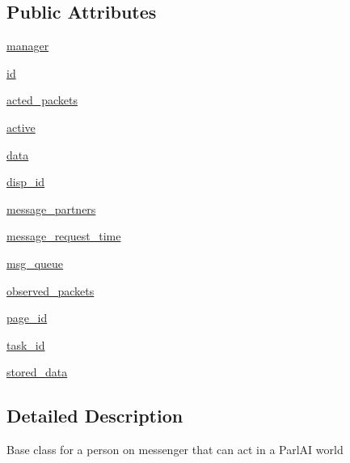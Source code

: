 \subsection*{Public Attributes}
\begin{DoxyCompactItemize}
\item 
\hyperlink{classparlai_1_1messenger_1_1core_1_1agents_1_1MessengerAgent_a9fd8bad20f0717092f529c8f9ed7df94}{manager}
\item 
\hyperlink{classparlai_1_1messenger_1_1core_1_1agents_1_1MessengerAgent_a72910180b745a5021b8d0a9e0957adcd}{id}
\item 
\hyperlink{classparlai_1_1messenger_1_1core_1_1agents_1_1MessengerAgent_a8ff8c167fe3e4793917c3d6e642fa3b5}{acted\+\_\+packets}
\item 
\hyperlink{classparlai_1_1messenger_1_1core_1_1agents_1_1MessengerAgent_afab06698dbe80ea6d9e9b34edbff254f}{active}
\item 
\hyperlink{classparlai_1_1messenger_1_1core_1_1agents_1_1MessengerAgent_a506c2b7c57f4573cc7fc88663fc80c93}{data}
\item 
\hyperlink{classparlai_1_1messenger_1_1core_1_1agents_1_1MessengerAgent_a34f9d8aa8209171eceac226c8aead2f7}{disp\+\_\+id}
\item 
\hyperlink{classparlai_1_1messenger_1_1core_1_1agents_1_1MessengerAgent_a4299892248e815aa4b81252b80ed68ea}{message\+\_\+partners}
\item 
\hyperlink{classparlai_1_1messenger_1_1core_1_1agents_1_1MessengerAgent_a60074f287b87c22153a18c0dc86389f1}{message\+\_\+request\+\_\+time}
\item 
\hyperlink{classparlai_1_1messenger_1_1core_1_1agents_1_1MessengerAgent_a3b73f02aa706918d26fd5cf42a441753}{msg\+\_\+queue}
\item 
\hyperlink{classparlai_1_1messenger_1_1core_1_1agents_1_1MessengerAgent_a941b3f00ff2f9dd47416e21fe5746048}{observed\+\_\+packets}
\item 
\hyperlink{classparlai_1_1messenger_1_1core_1_1agents_1_1MessengerAgent_ac944940796b2b11dfb38eb683cca9222}{page\+\_\+id}
\item 
\hyperlink{classparlai_1_1messenger_1_1core_1_1agents_1_1MessengerAgent_a1e5058b5b6b5d3695647e87aac51d59d}{task\+\_\+id}
\item 
\hyperlink{classparlai_1_1messenger_1_1core_1_1agents_1_1MessengerAgent_a48f3557d0d5e74fb73304a01af2fd7fa}{stored\+\_\+data}
\end{DoxyCompactItemize}


\subsection{Detailed Description}
\begin{DoxyVerb}Base class for a person on messenger that can act in a ParlAI world\end{DoxyVerb}
 

